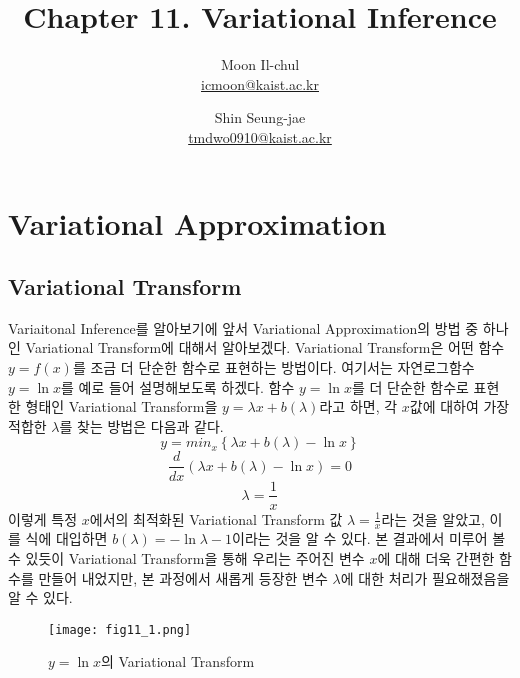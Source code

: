 \documentclass[draft=false]{oblivoir}
\author{Moon Il-chul \\ \href{mailto:icmoon@kaist.ac.kr}{icmoon@kaist.ac.kr} 
   \and Shin Seung-jae \\ \href{mailto:tmdwo0910@kaist.ac.kr}{tmdwo0910@kaist.ac.kr} }
\title{Chapter 11. Variational Inference}
\begin{document}
\maketitle

\tableofcontents


\newpage

\section{Variational Approximation}

\subsection{Variational Transform}
Variaitonal Inference를 알아보기에 앞서 Variational Approximation의 방법 중 하나인 Variational Transform에 대해서 알아보겠다. Variational Transform은 어떤 함수 $y=f(x)$를 조금 더 단순한 함수로 표현하는 방법이다.
여기서는 자연로그함수 $y =\ln x$를 예로 들어 설명해보도록 하겠다. 함수 $y = \ln x$를 더 단순한 함수로 표현한 형태인 Variational Transform을 $y = \lambda x + b(\lambda)$라고 하면, 각 $x$값에 대하여 가장 적합한 $\lambda$를 찾는 방법은 다음과 같다.
\begin{equation}
y = min_{x} \left\{ \lambda x + b(\lambda) - \ln x \right\}
\label{eq:11-2-1}
\end{equation}
\begin{equation}
{\frac{d}{dx}}(\lambda x +b(\lambda) -\ln x )=0
\label{eq:11-2-2-1}
\end{equation}
\begin{equation}
\lambda = \frac{1}{x}
\label{eq:11-2-3-1}
\end{equation}
이렇게 특정 $x$에서의 최적화된 Variational Transform 값 $ \lambda = \frac{1}{x}$라는 것을 알았고, 이를 식에 대입하면 $b(\lambda) = -\ln \lambda -1$이라는 것을 알 수 있다. 본 결과에서 미루어 볼 수 있듯이 Variational Transform을 통해 우리는 주어진 변수 $x$에 대해 더욱 간편한 함수를 만들어 내었지만, 본 과정에서 새롭게 등장한 변수 $\lambda$에 대한 처리가 필요해졌음을 알 수 있다.

\begin{figure}[ht] \centering 
\texttt{[image: fig11\_1.png]} 
\caption{ $y = \ln x$의 Variational Transform}
\label{fig:11-1}
\end{figure}
\end{document}
